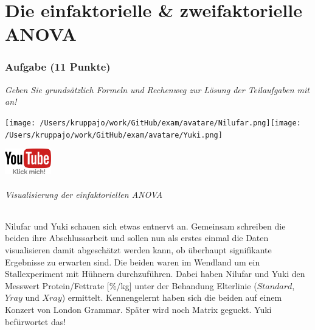\documentclass[a4paper, 9pt]{scrartcl}\usepackage[]{graphicx}\usepackage[]{xcolor}
\begin{document}
\clearpage
\part{Die einfaktorielle \& zweifaktorielle ANOVA}

\section{Aufgabe \hfill (11 Punkte)}

\textit{Geben Sie grundsätzlich Formeln und Rechenweg zur Lösung der Teilaufgaben mit an!} \\[1Ex]
 

 
\begin{minipage}[t]{0.5\textwidth}
\texttt{[image: /Users/kruppajo/work/GitHub/exam/avatare/Nilufar.png]}\hspace{-4mm}\texttt{[image: /Users/kruppajo/work/GitHub/exam/avatare/Yuki.png]}
\end{minipage}
\begin{minipage}[t]{0.5\textwidth}
\hfill
\href{https://youtu.be/kHmfEmU6lrk}{\includegraphics[width = 2cm]{img/youtube}}
\end{minipage}



\paragraph{Visualisierung der einfaktoriellen ANOVA}

Nilufar und Yuki schauen sich etwas entnervt an. Gemeinsam schreiben die beiden ihre Abschlussarbeit und sollen nun als erstes einmal die Daten visualisieren damit abgeschätzt werden kann, ob überhaupt signifikante Ergebnisse zu erwarten sind. Die beiden waren im Wendland um ein Stallexperiment mit Hühnern durchzuführen. Dabei haben Nilufar und Yuki den Messwert Protein/Fettrate [\%/kg] unter der Behandung Elterlinie ($Standard$, $Yray$ und $Xray$) ermittelt. Kennengelernt haben sich die beiden auf einem Konzert von London Grammar. Später wird noch Matrix geguckt. Yuki befürwortet das!
\end{document}
